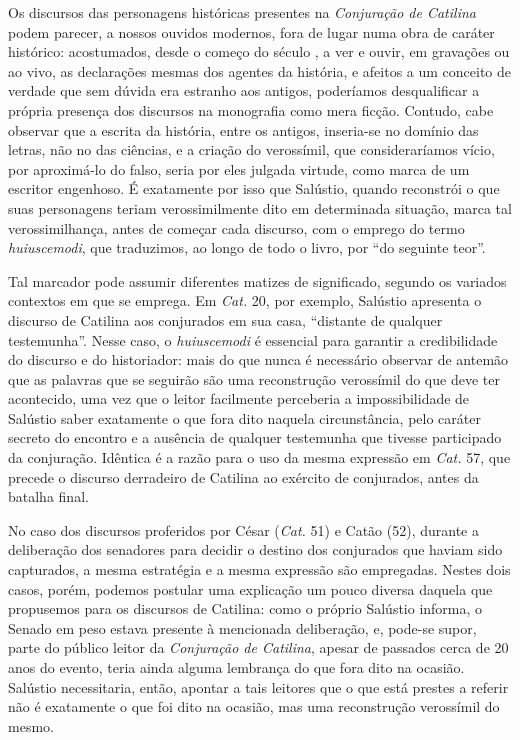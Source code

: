 Os discursos das personagens históricas presentes na \emph{Conjuração de Catilina}
podem parecer, a nossos ouvidos modernos, fora de lugar numa obra de caráter
histórico: acostumados, desde o começo do século , a ver e ouvir, em
gravações ou ao vivo, as declarações mesmas dos agentes da história, e afeitos
a um conceito de verdade que sem dúvida era estranho aos antigos, poderíamos
desqualificar a própria presença dos discursos na monografia como mera ficção.
Contudo, cabe observar que a escrita da história, entre os antigos, inseria-se
no domínio das letras, não no das ciências, e a criação do verossímil, que
consideraríamos vício, por aproximá-lo do falso, seria por eles julgada
virtude, como marca de um escritor engenhoso.  É exatamente por isso que
Salústio, quando reconstrói o que suas personagens teriam verossimilmente dito
em determinada situação, marca tal verossimilhança, antes de começar cada
discurso, com o emprego do termo \emph{huiuscemodi}, que traduzimos, ao longo de
todo o livro, por “do seguinte teor”. 

Tal marcador pode assumir diferentes matizes de significado, segundo os variados contextos em que se emprega.  Em \emph{Cat.} 20, por exemplo, Salústio apresenta o discurso de Catilina aos conjurados em sua casa, ``distante de qualquer testemunha''. Nesse caso, o \emph{huiuscemodi} é essencial para garantir a credibilidade do discurso e do historiador:  mais do que nunca é necessário observar de antemão que as
  palavras que se seguirão são uma reconstrução verossímil do que deve ter
  acontecido, uma vez que o leitor facilmente perceberia a impossibilidade de
  Salústio saber exatamente o que fora dito naquela circunstância, pelo
  caráter secreto do encontro e a ausência de qualquer testemunha que tivesse
  participado da conjuração. Idêntica é a razão para o
  uso da mesma expressão em \emph{Cat.} 57, que precede o discurso
  derradeiro de Catilina ao exército de conjurados, antes da batalha final.

No caso dos discursos proferidos por César (\emph{Cat.} 51) e Catão (52),
durante a deliberação dos senadores para decidir o destino dos conjurados que
haviam sido capturados, a mesma estratégia e a mesma expressão são empregadas. Nestes dois casos, porém,
  podemos postular uma explicação um pouco diversa daquela que propusemos para
  os discursos de Catilina: como o próprio Salústio informa, o Senado em peso
  estava presente à mencionada deliberação, e, pode-se supor, parte do público
  leitor da \emph{Conjuração de Catilina}, apesar de passados cerca de 20 anos
  do evento, teria ainda alguma lembrança do que fora dito na ocasião. Salústio
  necessitaria, então, apontar a tais leitores que o que está prestes a referir
  não é exatamente o que foi dito na ocasião, mas uma reconstrução verossímil
  do mesmo. 

